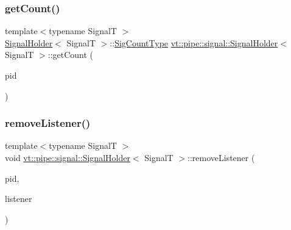 \mbox{\label{structvt_1_1pipe_1_1signal_1_1_signal_holder_aefb0dca5bdcb08b867c24b29f1d48429}} 
\subsubsection{\texorpdfstring{get\+Count()}{getCount()}}
{\footnotesize\ttfamily template$<$typename SignalT $>$ \\
\hyperlink{structvt_1_1pipe_1_1signal_1_1_signal_holder}{Signal\+Holder}$<$ SignalT $>$\+::\hyperlink{structvt_1_1pipe_1_1signal_1_1_signal_holder_aced54515f402b63f6dea174e5b027c81}{Sig\+Count\+Type} \hyperlink{structvt_1_1pipe_1_1signal_1_1_signal_holder}{vt\+::pipe\+::signal\+::\+Signal\+Holder}$<$ SignalT $>$\+::get\+Count (\begin{DoxyParamCaption}\item[{\hyperlink{namespacevt_ac9852acda74d1896f48f406cd72c7bd3}{Pipe\+Type} const \&}]{pid }\end{DoxyParamCaption})}

\mbox{\label{structvt_1_1pipe_1_1signal_1_1_signal_holder_a5be1905ef30b9c0e8764daa5f471d445}} 
\subsubsection{\texorpdfstring{remove\+Listener()}{removeListener()}\hspace{0.1cm}{\footnotesize\ttfamily [1/2]}}
{\footnotesize\ttfamily template$<$typename SignalT $>$ \\
void \hyperlink{structvt_1_1pipe_1_1signal_1_1_signal_holder}{vt\+::pipe\+::signal\+::\+Signal\+Holder}$<$ SignalT $>$\+::remove\+Listener (\begin{DoxyParamCaption}\item[{\hyperlink{namespacevt_ac9852acda74d1896f48f406cd72c7bd3}{Pipe\+Type} const \&}]{pid,  }\item[{\hyperlink{structvt_1_1pipe_1_1signal_1_1_signal_holder_a68114d1ad5804c71e014736b18e41e08}{Listener\+Ptr\+Type}}]{listener }\end{DoxyParamCaption})}

